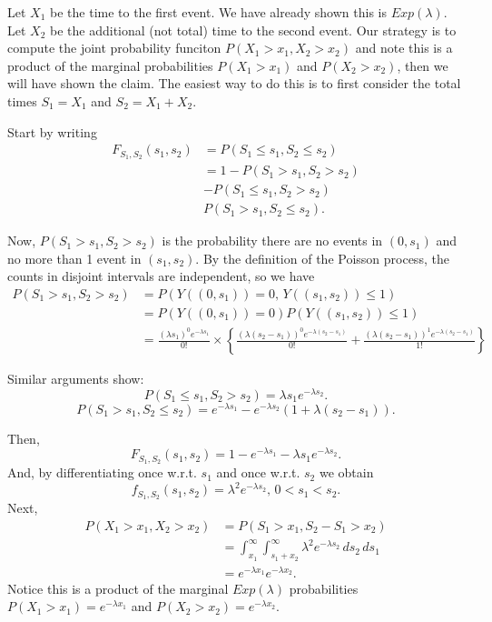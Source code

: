 \documentclass[
]{book}
\begin{document}
Let \(X_1\) be the time to the first event. We have already shown this is \(Exp(\lambda)\). Let \(X_2\) be the additional (not total) time to the second event. Our strategy is to compute the joint probability funciton \(P(X_1 >x_1, X_2 >x_2)\) and note this is a product of the marginal probabilities \(P(X_1 >x_1)\) and \(P(X_2 >x_2)\), then we will have shown the claim. The easiest way to do this is to first consider the total times \(S_1 = X_1\) and \(S_2 = X_1 + X_2\).

Start by writing
\begin{align*}
F_{S_1, S_2}(s_1, s_2) &= P(S_1 \leq s_1, S_2 \leq s_2)\\
& = 1 - P(S_1 > s_1, S_2 > s_2) \\
&- P(S_1 \leq s_1, S_2 > s_2)\\
&P(S_1 > s_1, S_2 \leq s_2).
\end{align*}

Now, \(P(S_1 > s_1, S_2 > s_2)\) is the probability there are no events in \((0,s_1)\) and no more than 1 event in \((s_1, s_2)\). By the definition of the Poisson process, the counts in disjoint intervals are independent, so we have
\begin{align*}
P(S_1 > s_1, S_2 > s_2) & = P(Y((0, s_1)) = 0, \, Y((s_1, s_2))\leq 1)\\
& = P(Y((0, s_1)) = 0)P(Y((s_1, s_2))\leq 1)\\
& = \frac{(\lambda s_1)^0e^{-\lambda s_1}}{0!}\times\left\{ \frac{(\lambda (s_2-s_1))^0e^{-\lambda (s_2-s_1)}}{0!}+ \frac{(\lambda (s_2-s_1))^1e^{-\lambda (s_2-s_1)}}{1!}\right\}
\end{align*}

Similar arguments show:
\[P(S_1 \leq s_1, S_2 > s_2) = \lambda s_1 e^{-\lambda s_2}.\]
\[P(S_1 > s_1, S_2 \leq s_2) = e^{-\lambda s_1} - e^{-\lambda s_2}(1+\lambda(s_2 - s_1)).\]

Then,
\[F_{S_1, S_2}(s_1, s_2) = 1-e^{-\lambda s_1} - \lambda s_1 e^{-\lambda s_2}.\]
And, by differentiating once w.r.t. \(s_1\) and once w.r.t. \(s_2\) we obtain
\[f_{S_1, S_2}(s_1, s_2) = \lambda^2e^{-\lambda s_2}, \, 0<s_1<s_2.\]
Next,
\begin{align*}
P(X_1 > x_1, X_2 > x_2) &= P(S_1 > x_1, S_2-S_1 > x_2)\\
& = \int_{x_1}^\infty \int_{s_1 + x_2}^\infty \lambda^2 e^{-\lambda s_2}\,ds_2\,ds_1\\
& = e^{-\lambda x_1}e^{-\lambda x_2}.
\end{align*}
Notice this is a product of the marginal \(Exp(\lambda)\) probabilities \(P(X_1 > x_1) = e^{-\lambda x_1}\) and \(P(X_2 > x_2) = e^{-\lambda x_2}\).
\end{document}
